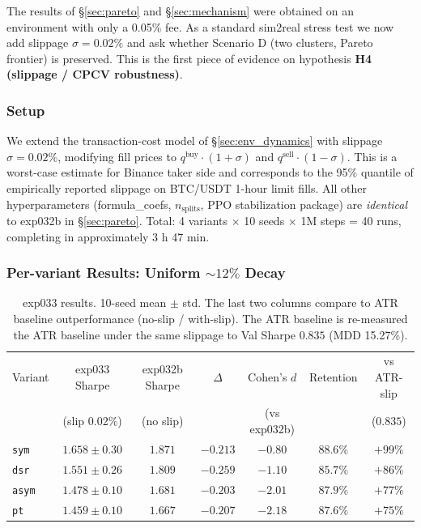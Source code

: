 \documentclass[11pt, a4paper]{article}
\begin{document}
The results of \S\ref{sec:pareto} and \S\ref{sec:mechanism} were obtained on
an environment with only a 0.05\% fee. As a standard sim2real stress test we
now add slippage $\sigma = 0.02\%$ and ask whether Scenario D (two clusters,
Pareto frontier) is preserved. This is the first piece of evidence on
hypothesis \textbf{H4 (slippage / CPCV robustness)}.

\subsubsection{Setup}
\label{sec:slippage_setup}

We extend the transaction-cost model of \S\ref{sec:env_dynamics} with
slippage $\sigma = 0.02\%$, modifying fill prices to
$q^{\mathrm{buy}} \cdot (1+\sigma)$ and $q^{\mathrm{sell}} \cdot (1-\sigma)$.
This is a worst-case estimate for Binance taker side and corresponds to the
95\% quantile of empirically reported slippage on BTC/USDT 1-hour limit
fills. All other hyperparameters (formula\_coefs, $n_{\text{splits}}$,
PPO stabilization package) are \emph{identical} to exp032b in
\S\ref{sec:pareto}. Total: 4 variants $\times$ 10 seeds $\times$ 1M steps =
40 runs, completing in approximately 3 h 47 min.

\subsubsection{Per-variant Results: Uniform $\sim 12\%$ Decay}
\label{sec:slippage_per_variant}

\begin{table}[!htbp]
\centering
\small
\caption{exp033 results. 10-seed mean $\pm$ std. The last two columns compare
to ATR baseline outperformance (no-slip / with-slip). The ATR baseline is re-measured
the ATR baseline under the same slippage to Val Sharpe $0.835$
(MDD 15.27\%).}
\begin{tabular}{lcccccc}
\toprule
Variant & exp033 Sharpe & exp032b Sharpe & $\Delta$ & Cohen's $d$ & Retention & vs ATR-slip \\
 & (slip 0.02\%) & (no slip) & & (vs exp032b) & & ($0.835$) \\
\midrule
\texttt{sym}  & $1.658 \pm 0.30$ & $1.871$ & $-0.213$ & $-0.80$ & $88.6\%$ & $+99\%$ \\
\texttt{dsr}  & $1.551 \pm 0.26$ & $1.809$ & $-0.259$ & $-1.10$ & $85.7\%$ & $+86\%$ \\
\texttt{asym} & $1.478 \pm 0.10$ & $1.681$ & $-0.203$ & $-2.01$ & $87.9\%$ & $+77\%$ \\
\texttt{pt}   & $1.459 \pm 0.10$ & $1.667$ & $-0.207$ & $-2.18$ & $87.6\%$ & $+75\%$ \\
\bottomrule
\end{tabular}
\label{tab:slippage_per_variant}
\end{table}
\end{document}
